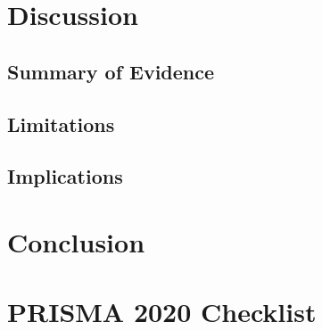 \section{Discussion}\label{sec:discussion}


\subsection{Summary of Evidence}\label{sec:summary}

\subsection{Limitations}\label{sec:limitations}

\subsection{Implications}\label{sec:implications}

\section{Conclusion}\label{sec:conclusion}





\appendix

\section{PRISMA 2020 Checklist}\label{app:prisma-2020}



